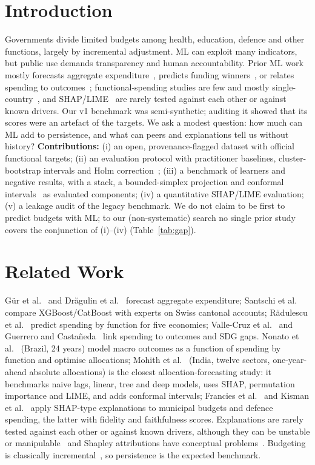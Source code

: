 \documentclass[conference]{IEEEtran}
\DeclareRobustCommand*{\_}{\textunderscore\hskip0pt\relax}
\begin{document}
\section{Introduction}
Governments divide limited budgets among health, education, defence and other functions, largely by incremental adjustment. ML can exploit many indicators, but public use demands transparency and human accountability. Prior ML work mostly forecasts aggregate expenditure~\cite{gur2025,dragulin2025}, predicts funding winners~\cite{caravaggio2025,distefano2025}, or relates spending to outcomes~\cite{valle2022,guerrero2022}; functional-spending studies are few and mostly single-country~\cite{santschi2024,radulescu2015,nonato2026,mohith2026}, and SHAP/LIME~\cite{lundberg2017,ribeiro2016} are rarely tested against each other or against known drivers. Our v1 benchmark was semi-synthetic; auditing it showed that its scores were an artefact of the targets. We ask a modest question: how much can ML add to persistence, and what can peers and explanations tell us without history? \textbf{Contributions:} (i) an open, provenance-flagged dataset with official functional targets; (ii) an evaluation protocol with practitioner baselines, cluster-bootstrap intervals and Holm correction~\cite{holm1979}; (iii) a benchmark of learners and negative results, with a stack, a bounded-simplex projection and conformal intervals~\cite{lei2018,angelopoulos2023} as evaluated components; (iv) a quantitative SHAP/LIME evaluation; (v) a leakage audit of the legacy benchmark. We do not claim to be first to predict budgets with ML; to our (non-systematic) search no single prior study covers the conjunction of (i)--(iv) (Table~\ref{tab:gap}).

\section{Related Work}
G\"ur et al.~\cite{gur2025} and Dr\u{a}gulin et al.~\cite{dragulin2025} forecast aggregate expenditure; Santschi et al.~\cite{santschi2024} compare XGBoost/CatBoost with experts on Swiss cantonal accounts; R\u{a}dulescu et al.~\cite{radulescu2015} predict spending by function for five economies; Valle-Cruz et al.~\cite{valle2022} and Guerrero and Casta\~neda~\cite{guerrero2022} link spending to outcomes and SDG gaps. Nonato et al.~\cite{nonato2026} (Brazil, 24 years) model macro outcomes as a function of spending by function and optimise allocations; Mohith et al.~\cite{mohith2026} (India, twelve sectors, one-year-ahead absolute allocations) is the closest allocation-forecasting study: it benchmarks naive lags, linear, tree and deep models, uses SHAP, permutation importance and LIME, and adds conformal intervals; Francies et al.~\cite{francies2026} and Kisman et al.~\cite{kisman2026} apply SHAP-type explanations to municipal budgets and defence spending, the latter with fidelity and faithfulness scores. Explanations are rarely tested against each other or against known drivers, although they can be unstable or manipulable~\cite{alvarezmelis2018,slack2020} and Shapley attributions have conceptual problems~\cite{kumar2020}. Budgeting is classically incremental~\cite{davis1966}, so persistence is the expected benchmark.

\end{document}
